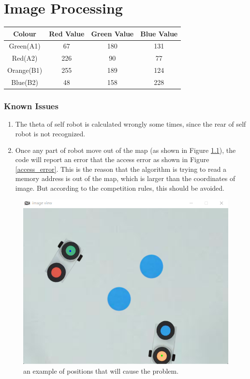 \chapter{Image Processing}
\label{cha:IP}

\begin{table}[h]\small
    \begin{tabular}{c|ccc}
    \hline 
    Colour&Red Value&Green Value&Blue Value\\
    \hline 
    Green(A1)&67&180&131\\
    Red(A2)&226&90&77\\
    Orange(B1)&255&189&124\\
    Blue(B2)&48&158&228\\
    \hline 
    \end{tabular}
    \end{table}

\subsection{Known Issues}

\begin{enumerate}
    \item[1)] The theta of self robot is calculated wrongly some times, since the rear of self robot is not recognized.
    \item[2)] Once any part of robot move out of the map (as shown in Figure \ref{wrong_position}), the code will report an error that the access error as shown in Figure \ref{access_error}. This is the reason that the algorithm is trying to read a memory address is out of the map, which is larger than the coordinates of image. But according to the competition rules, this should be avoided.
\end{enumerate}

\begin{figure}[thb]
    \centering
    \includegraphics[width=1\textwidth]{images/wrong_position.png}
    \caption[wrong position]{an example of positions that will cause the problem.}\label{wrong_position}
\end{figure}

